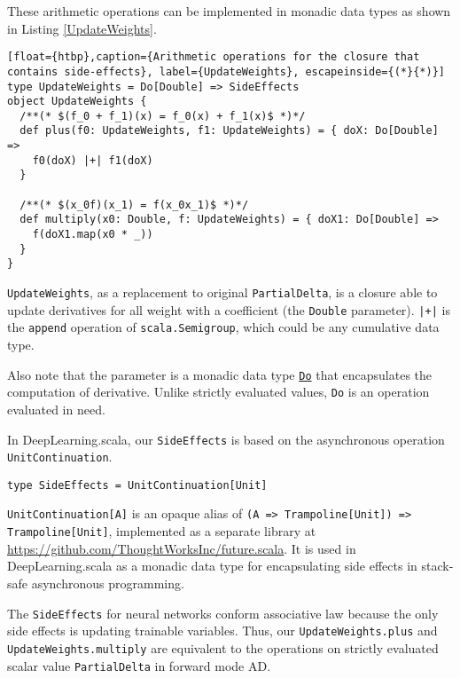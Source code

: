 These arithmetic operations can be implemented in monadic data types as shown in Listing \ref{UpdateWeights}.

\begin{lstlisting}[float={htbp},caption={Arithmetic operations for the closure that contains side-effects}, label={UpdateWeights}, escapeinside={(*}{*)}]
type UpdateWeights = Do[Double] => SideEffects
object UpdateWeights {
  /**(* $(f_0 + f_1)(x) = f_0(x) + f_1(x)$ *)*/
  def plus(f0: UpdateWeights, f1: UpdateWeights) = { doX: Do[Double] =>
    f0(doX) |+| f1(doX)
  }

  /**(* $(x_0f)(x_1) = f(x_0x_1)$ *)*/
  def multiply(x0: Double, f: UpdateWeights) = { doX1: Do[Double] =>
    f(doX1.map(x0 * _))
  }
}
\end{lstlisting}

\lstinline{UpdateWeights}, as a replacement to original \lstinline{PartialDelta}, is a closure able to update derivatives for all weight with a coefficient (the \lstinline{Double} parameter).
\lstinline{|+|} is the \lstinline{append} operation of \lstinline{scala.Semigroup}, which could be any cumulative data type.

Also note that the parameter is a monadic data type \href{https://javadoc.io/page/com.thoughtworks.raii/asynchronous_2.11/latest/com/thoughtworks/raii/asynchronous$$Do.html}{\lstinline{Do}} that encapsulates the computation of derivative. Unlike strictly evaluated values, \lstinline{Do} is an operation evaluated in need.

In DeepLearning.scala, our \lstinline{SideEffects} is based on the asynchronous operation \lstinline{UnitContinuation}.

\begin{lstlisting}[float={htbp},caption={Monadic side-effects}, label={SideEffects}]
type SideEffects = UnitContinuation[Unit]
\end{lstlisting}

\lstinline{UnitContinuation[A]} is an opaque alias \cite{erik2017opaque} of \lstinline{(A => Trampoline[Unit]) => Trampoline[Unit]}, implemented as a separate library at \url{https://github.com/ThoughtWorksInc/future.scala}. It is used in DeepLearning.scala as a monadic data type for encapsulating side effects in stack-safe asynchronous programming.

The \lstinline{SideEffects} for neural networks conform associative law because the only side effects is updating \glspl{trainable variable}. Thus, our \lstinline{UpdateWeights.plus} and \lstinline{UpdateWeights.multiply} are equivalent to the operations on strictly evaluated scalar value \lstinline{PartialDelta} in forward mode AD.

